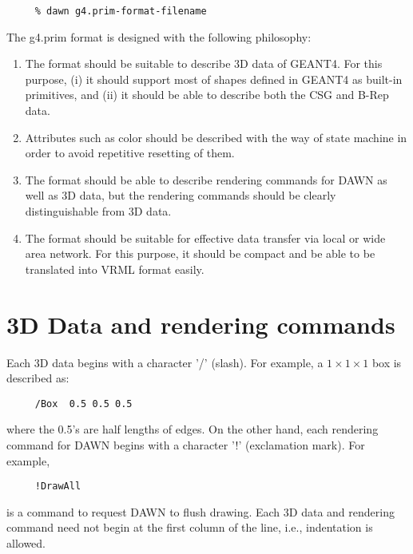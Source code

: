 \begin{verbatim}
     % dawn g4.prim-format-filename
\end{verbatim}

The g4.prim format is designed with the following philosophy:  

\begin{enumerate}
\item  The format should be suitable to describe 3D data of GEANT4.
       For this purpose,  
       (i) it should support most of shapes defined in GEANT4  
       as built-in primitives, and   
       (ii) it should be able to describe both the CSG and B-Rep data.  
\item  Attributes such as color should be described with the way of  
       state machine in order to avoid repetitive resetting of them.  
\item The format should be able to describe rendering commands for
      DAWN as well as 3D data,  
      but the rendering commands should be clearly distinguishable  
      from 3D data.  
\item The format should be suitable for effective data transfer  
      via local or wide area network. For this purpose,   
      it should be compact and be able to be translated into VRML format
      easily.
\end{enumerate}



\section{3D Data and rendering commands}   

Each 3D data begins with a character '/' (slash).  
For example, a $1\times{}1\times{}1$ box is described as:   

\begin{verbatim}
     /Box  0.5 0.5 0.5
\end{verbatim}

\noindent
where the 0.5's are half lengths of edges.
On the other hand,  
each rendering command for DAWN begins with a character '!' 
(exclamation mark).  
For example,  

\begin{verbatim}
     !DrawAll
\end{verbatim}
\noindent
is a command to request DAWN to flush drawing.  
Each 3D data and rendering command need not
begin at the first column of the line, i.e., 
indentation is allowed.

